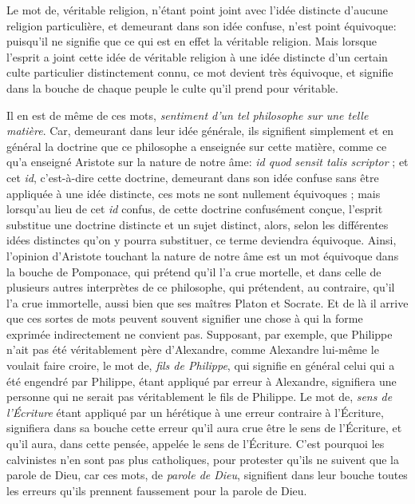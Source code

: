 Le mot de, véritable religion, n'étant point joint avec l'idée distincte d'aucune religion particulière, et demeurant dans son idée confuse, n'est point équivoque: puisqu'il ne signifie que ce qui est en effet la véritable religion. Mais lorsque l'esprit a joint cette idée de véritable religion à une idée distincte d'un certain culte particulier distinctement connu, ce mot devient très équivoque, et signifie dans la bouche de chaque peuple le culte qu'il prend pour véritable.

Il en est de même de ces mots, \emph{sentiment d'un tel philosophe sur une telle matière}. Car, demeurant dans leur idée générale, ils signifient simplement et en général la doctrine que ce philosophe a enseignée sur cette matière, comme ce qu'a enseigné Aristote sur la nature de notre âme: \emph{id quod sensit talis scriptor} ; et cet \emph{id}, c'est-à-dire cette doctrine, demeurant dans son idée confuse sans être appliquée à une idée distincte, ces mots ne sont nullement équivoques ; mais lorsqu'au lieu de cet \emph{id} confus, de cette doctrine confusément conçue, l'esprit substitue une doctrine distincte et un sujet distinct, alors, selon les différentes idées distinctes qu'on y pourra substituer, ce terme deviendra équivoque. Ainsi, l'opinion d'Aristote touchant la nature de notre âme est un mot équivoque dans la bouche de Pomponace, qui prétend qu'il l'a crue mortelle, et dans celle de plusieurs autres interprètes de ce philosophe, qui prétendent, au contraire, qu'il l'a crue immortelle, aussi bien que ses maîtres Platon et Socrate. Et de là il arrive que ces sortes de mots peuvent souvent signifier une chose à qui la forme exprimée indirectement ne convient pas. Supposant, par exemple, que Philippe n'ait pas été véritablement père d'Alexandre, comme Alexandre lui-même le voulait faire croire, le mot de, \emph{fils de Philippe}, qui signifie en général celui qui a été engendré par Philippe, étant appliqué par erreur à Alexandre, signifiera une personne qui ne serait pas véritablement le fils de Philippe. Le mot de, \emph{sens de l'Écriture} étant appliqué par un hérétique à une erreur contraire à l'Écriture, signifiera dans sa bouche cette erreur qu'il aura crue être le sens de l'Écriture, et qu'il aura, dans cette pensée, appelée le sens de l'Écriture. C'est pourquoi les calvinistes n'en sont pas plus catholiques, pour protester qu'ils ne suivent que la parole de Dieu, car ces mots, de \emph{parole de Dieu}, signifient dans leur bouche toutes les erreurs qu'ils prennent faussement pour la parole de Dieu.

